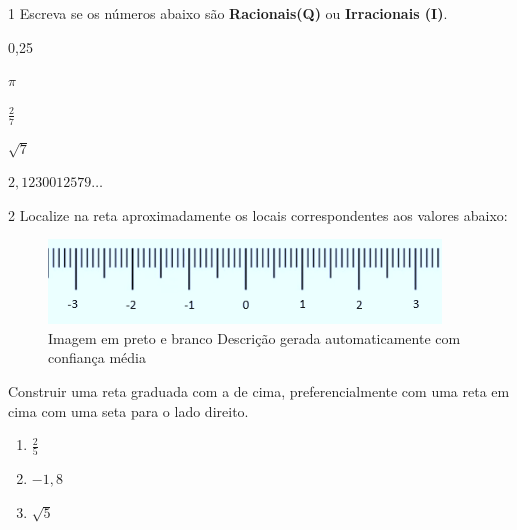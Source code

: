 
\num{1} Escreva se os números abaixo são \textbf{Racionais(Q)} ou 
\textbf{Irracionais (I)}.

\begin{escolha}
  
  \item 0,25

  \item $\pi$
  
  \item $\frac{2}{7}$
  
  \item $\sqrt{7}$
  
  \item $2,1230012579\ldots{}$

\end{escolha}


\num{2} Localize na reta aproximadamente os locais correspondentes aos
valores abaixo:

\begin{figure}
\centering
\includegraphics[width=4.10036in,height=0.88341in]{./_SAEB_9_MAT/media/image4.png}
\caption{Imagem em preto e branco Descrição gerada automaticamente com
confiança média}
\end{figure}

Construir uma reta graduada com a de cima, preferencialmente com uma
reta em cima com uma seta para o lado direito.

\begin{enumerate}
  
  \item $\frac{2}{5}$

  \item $- 1,8$
  
  \item $\sqrt{5}$

\end{enumerate}

